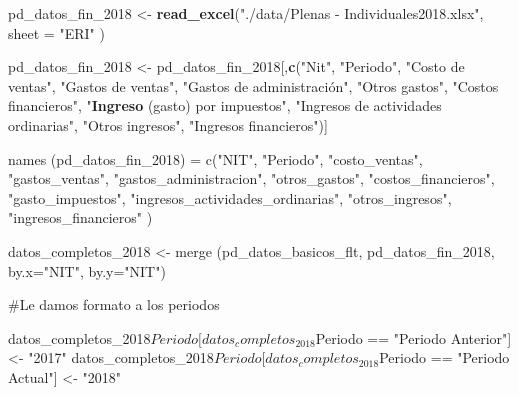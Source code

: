 \documentclass[
  11pt,
  a4paper,
]{book}
\newenvironment{Shaded}{\begin{snugshade}}{\end{snugshade}}
\newcommand{\DataTypeTok}[1]{\textcolor[rgb]{0.13,0.29,0.53}{#1}}
\newcommand{\DecValTok}[1]{\textcolor[rgb]{0.00,0.00,0.81}{#1}}
\newcommand{\KeywordTok}[1]{\textcolor[rgb]{0.13,0.29,0.53}{\textbf{#1}}}
\newcommand{\NormalTok}[1]{#1}
\newcommand{\StringTok}[1]{\textcolor[rgb]{0.31,0.60,0.02}{#1}}
\begin{document}
\begin{Shaded}
\begin{Highlighting}[]
\NormalTok{pd_datos_fin_}\DecValTok{2018}\NormalTok{ <-}\StringTok{ }\KeywordTok{read_excel}\NormalTok{(}\StringTok{"./data/Plenas - Individuales2018.xlsx"}\NormalTok{, }
                                \DataTypeTok{sheet =} \StringTok{"ERI"}\NormalTok{ )}

\NormalTok{pd_datos_fin_}\DecValTok{2018}\NormalTok{ <-}\StringTok{ }\NormalTok{pd_datos_fin_}\DecValTok{2018}\NormalTok{[,}\KeywordTok{c}\NormalTok{(}\StringTok{"Nit"}\NormalTok{, }\StringTok{"Periodo"}\NormalTok{, }\StringTok{"Costo de ventas"}\NormalTok{, }
  \StringTok{"Gastos de ventas"}\NormalTok{, }\StringTok{"Gastos de administración", "}\NormalTok{Otros gastos}\StringTok{", }
\StringTok{  "}\NormalTok{Costos financieros}\StringTok{", "}\KeywordTok{Ingreso}\NormalTok{ (gasto) por impuestos}\StringTok{", }
\StringTok{  "}\NormalTok{Ingresos de actividades ordinarias}\StringTok{", "}\NormalTok{Otros ingresos}\StringTok{", "}\NormalTok{Ingresos financieros}\StringTok{")]}

\StringTok{names (pd_datos_fin_2018) = c("}\NormalTok{NIT}\StringTok{", "}\NormalTok{Periodo}\StringTok{", "}\NormalTok{costo_ventas}\StringTok{", "}\NormalTok{gastos_ventas}\StringTok{",}
\StringTok{  "}\NormalTok{gastos_administracion}\StringTok{", "}\NormalTok{otros_gastos}\StringTok{", "}\NormalTok{costos_financieros}\StringTok{", "}\NormalTok{gasto_impuestos}\StringTok{",}
\StringTok{  "}\NormalTok{ingresos_actividades_ordinarias}\StringTok{", "}\NormalTok{otros_ingresos}\StringTok{", "}\NormalTok{ingresos_financieros}\StringTok{" )}

\StringTok{datos_completos_2018 <- merge (pd_datos_basicos_flt, pd_datos_fin_2018,}
\StringTok{                               by.x="}\NormalTok{NIT}\StringTok{", by.y="}\NormalTok{NIT}\StringTok{")}

\StringTok{#Le damos formato a los periodos}

\StringTok{datos_completos_2018$Periodo[datos_completos_2018$Periodo == "}\NormalTok{Periodo Anterior}\StringTok{"] <- }
\StringTok{  "}\DecValTok{2017}\StringTok{"}
\StringTok{datos_completos_2018$Periodo[datos_completos_2018$Periodo == "}\NormalTok{Periodo Actual}\StringTok{"] <- }
\StringTok{  "}\DecValTok{2018}\StringTok{"}
\end{Highlighting}
\end{Shaded}
\end{document}
